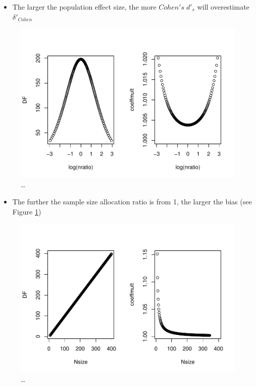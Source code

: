 \documentclass[
  man]{apa6}
\providecommand{\tightlist}{%
  \setlength{\itemsep}{0pt}\setlength{\parskip}{0pt}}
\begin{document}
\begin{itemize}
\tightlist
\item
  The larger the population effect size, the more \(Cohen's \; d'_s\) will overestimate \(\delta'_{Cohen}\)
\end{itemize}

\begin{figure}
\centering
\includegraphics{Theoretical-Bias-and-variance,-as-a-function-of-population-parameters_files/figure-latex/biascohendprimehomNratio2-1.pdf}
\caption{\label{fig:biascohendprimehomNratio2}\ldots{}}
\end{figure}

\begin{itemize}
\tightlist
\item
  The further the sample size allocation ratio is from 1, the larger the bias (see Figure \ref{fig:biascohendprimehomNratio2})
\end{itemize}

\begin{figure}
\centering
\includegraphics{Theoretical-Bias-and-variance,-as-a-function-of-population-parameters_files/figure-latex/biascohendprimehomNsize2-1.pdf}
\caption{\label{fig:biascohendprimehomNsize2}\ldots{}}
\end{figure}
\end{document}
